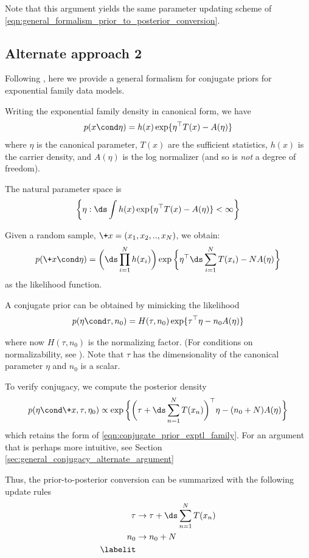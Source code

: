 \documentclass{article} %
\newcommand{\carrierDensity}{h}
\begin{document}


Note that this argument yields the same parameter updating scheme of \eqref{eqn:general_formalism_prior_to_posterior_conversion}.


\subsection{Alternate approach 2} \label{sec:ef_general_formalism_jordan}

Following \cite{jordan2010conjugate}, here we provide a general formalism for conjugate priors for exponential family data models. 

Writing the exponential family density in canonical form, we have
\[ p(x \cond \eta) = \carrierDensity(x) \exp \{ \eta^\top T(x) - A(\eta) \} \]
where $\eta$ is the canonical parameter, $T(x)$ are the sufficient statistics,  $\carrierDensity(x)$ is the carrier density, and $A(\eta)$ is the log normalizer (and so is \textit{not} a degree of freedom). 

The natural parameter space is 
\[  \bigg\{\eta : \ds\int \carrierDensity(x) \exp \{ \eta^\top T(x) - A(\eta) \} < \infty \bigg \}\]

Given a random sample, $\+x=(x_1, x_2, .., x_N)$, we obtain:
\[ p(\+x \cond \eta) = \bigg( \ds\prod_{i=1}^N \carrierDensity(x_i)  \bigg) \exp \bigg\{ \eta^\top  \ds\sum_{i=1}^N T(x_i) - N A(\eta) \bigg\} \]
as the likelihood function.

A conjugate prior can be obtained by mimicking the likelihood
\begin{equation}
p (\eta \cond \tau, n_0) = H(\tau, n_0) \exp \{ \tau^\top \eta - n_0 A(\eta)\}
\label{eqn:conjugate_prior_exptl_family}
\end{equation}

where now $H(\tau, n_0)$ is the normalizing factor.  (For conditions on normalizability, see \cite{jordan2010conjugate}).   Note that $\tau$ has the dimensionality of the canonical parameter $\eta$ and $n_0$ is a scalar.

To verify conjugacy, we compute the posterior density
\[ p (\eta \cond \+x, \tau, \eta_0)  \propto \exp \bigg\{ \bigg( \tau + \ds\sum_{n=1}^N  T(x_n) \bigg)^\top \eta - (n_0 + N) A(\eta) \bigg\} \]
which retains the form of \eqref{eqn:conjugate_prior_exptl_family}.  For an argument that is perhaps more intuitive, see Section \ref{sec:general_conjugacy_alternate_argument} 

Thus, the prior-to-posterior conversion can be summarized with the following update rules
\begin{align*}
\tau & \to \tau + \ds\sum_{n=1}^N T(x_n) \\
n_0 & \to  n_0 + N \\
\labelit \label{eqn:general_formalism_prior_to_posterior_conversion}
\end{align*}
\end{document}
